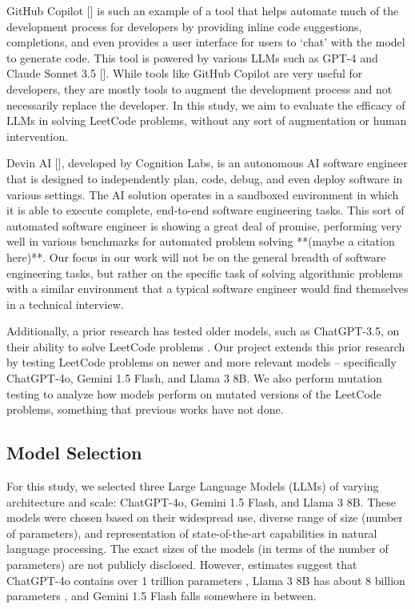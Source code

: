 \documentclass[times, 10pt,twocolumn]{article}
\begin{document}
GitHub Copilot [] is such an example of a tool that helps automate much of the development process for developers by providing inline code suggestions, completions, and even provides a user interface for users to `chat' with the model to generate code. This tool is powered by various LLMs such as GPT-4 and Claude Sonnet 3.5 []. While tools like GitHub Copilot are very useful for developers, they are mostly tools to augment the development process and not necessarily replace the developer. In this study, we aim to evaluate the efficacy of LLMs in solving LeetCode problems, without any sort of augmentation or human intervention.

Devin AI [], developed by Cognition Labs, is an autonomous AI software engineer that is designed to independently plan, code, debug, and even deploy software in various settings. The AI solution operates in a sandboxed environment in which it is able to execute complete, end-to-end software engineering tasks. This sort of automated software engineer is showing a great deal of promise, performing very well in various benchmarks for automated problem solving **(maybe a citation here)**. Our focus in our work will not be on the general breadth of software engineering tasks, but rather on the specific task of solving algorithmic problems with a similar environment that a typical software engineer would find themselves in a technical interview. 

Additionally, a prior research has tested older models, such as ChatGPT-3.5, on their ability to solve LeetCode problems \cite{li2024evaluatingchatgpt35efficiencysolving}. Our project extends this prior research by testing LeetCode problems on newer and more relevant models -- specifically ChatGPT-4o, Gemini 1.5 Flash, and Llama 3 8B. We also perform mutation testing to analyze how models perform on mutated versions of the LeetCode problems, something that previous works have not done.


\subsection{Model Selection}

For this study, we selected three Large Language Models (LLMs) of varying architecture and scale: ChatGPT-4o, Gemini 1.5 Flash, and Llama 3 8B. These models were chosen based on their widespread use, diverse range of size (number of parameters), and representation of state-of-the-art capabilities in natural language processing. The exact sizes of the models (in terms of the number of parameters) are not publicly disclosed. However, estimates suggest that ChatGPT-4o contains over 1 trillion parameters \cite{Lacy_2024}, Llama 3 8B has about 8 billion parameters \cite{AIatMeta_2024}, and Gemini 1.5 Flash falls somewhere in between.
\end{document}
